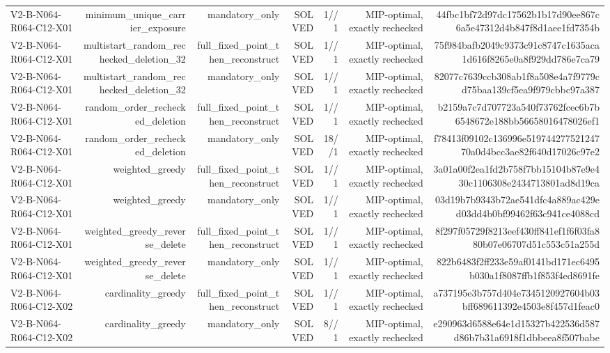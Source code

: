 {\begin{longtable}{lrrrrrr}
V2-B-N064-R064-C12-X01 & minimum\_unique\_carrier\_exposure & mandatory\_only & SOLVED & 1//1 & MIP-optimal, exactly rechecked & 44fbc1bf72d97dc17562b1b17d90ee867c6a5e47312d4b847f8d1aee1fd7354b \\
V2-B-N064-R064-C12-X01 & multistart\_random\_rechecked\_deletion\_32 & full\_fixed\_point\_then\_reconstruct & SOLVED & 1//1 & MIP-optimal, exactly rechecked & 75f984bafb2049c9373c91c8747c1635aca1d616f8265e0a8f929dd786e7ca79 \\
V2-B-N064-R064-C12-X01 & multistart\_random\_rechecked\_deletion\_32 & mandatory\_only & SOLVED & 1//1 & MIP-optimal, exactly rechecked & 82077c7639ccb308ab1f8a508e4a7f9779cd75baa139cf5ea9f979cbbc97a387 \\
V2-B-N064-R064-C12-X01 & random\_order\_rechecked\_deletion & full\_fixed\_point\_then\_reconstruct & SOLVED & 1//1 & MIP-optimal, exactly rechecked & b2159a7c7d707723a540f73762fcec6b7b6548672e188bb56658016478026ef1 \\
V2-B-N064-R064-C12-X01 & random\_order\_rechecked\_deletion & mandatory\_only & SOLVED & 18//1 & MIP-optimal, exactly rechecked & f78413f09102c136996e51974427752124770a0d4bcc3ae82f640d17026c97e2 \\
V2-B-N064-R064-C12-X01 & weighted\_greedy & full\_fixed\_point\_then\_reconstruct & SOLVED & 1//1 & MIP-optimal, exactly rechecked & 3a01a00f2ea1fd2b758f7bb15104b87e9e430c1106308e2434713801ad8d19ca \\
V2-B-N064-R064-C12-X01 & weighted\_greedy & mandatory\_only & SOLVED & 1//1 & MIP-optimal, exactly rechecked & 03d19b7b9343b72ae541dfc4a889ac429ed03dd4b0bf99462f63c941ce4088cd \\
V2-B-N064-R064-C12-X01 & weighted\_greedy\_reverse\_delete & full\_fixed\_point\_then\_reconstruct & SOLVED & 1//1 & MIP-optimal, exactly rechecked & 8f297f05729f8213eef430ff841ef1f6f03fa880b07e06707d51c553c51a255d \\
V2-B-N064-R064-C12-X01 & weighted\_greedy\_reverse\_delete & mandatory\_only & SOLVED & 1//1 & MIP-optimal, exactly rechecked & 822b6483f2ff233e59af0141bd171ec6495b030a1f8087ffb1f853f4ed8691fe \\
V2-B-N064-R064-C12-X02 & cardinality\_greedy & full\_fixed\_point\_then\_reconstruct & SOLVED & 1//1 & MIP-optimal, exactly rechecked & a737195e3b757d404e7345120927604b03bff689611392e4503e8f457d1feac0 \\
V2-B-N064-R064-C12-X02 & cardinality\_greedy & mandatory\_only & SOLVED & 8//1 & MIP-optimal, exactly rechecked & e290963d6588e64e1d15327b422536d587d86b7b31a6918f1dbbeea8f507babe \\

\end{longtable}}
